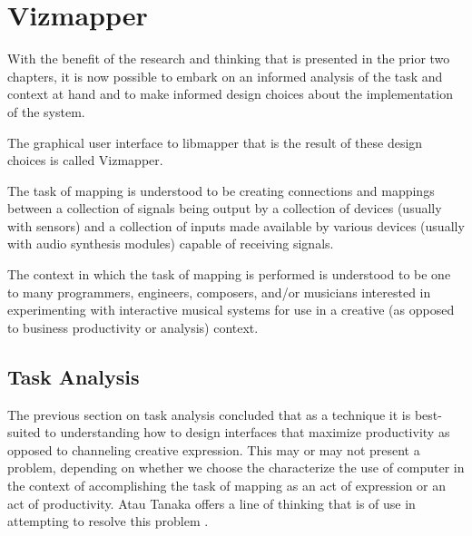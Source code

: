 \resetdatestamp

\chapter{Vizmapper}

With the benefit of the research and thinking that is presented in the prior two chapters, it is now possible to embark on an informed analysis of the task and context at hand and to make informed design choices about the implementation of the system.

The graphical user interface to libmapper that is the result of these design choices is called Vizmapper.

The task of mapping is understood to be creating connections and mappings between a collection of signals being output by a collection of devices (usually with sensors) and a collection of inputs made available by various devices (usually with audio synthesis modules)  capable of receiving signals.

The context in which the task of mapping is performed is understood to be one to many programmers, engineers, composers, and/or musicians interested in experimenting with interactive musical systems for use in a creative (as opposed to business productivity or analysis) context.

\section{Task Analysis}
\begin{comment}
Task analysis and human-computer interaction: approaches, techniques, and levels of analysis - Abe Crystal, Beth Ellington
\end{comment}

The previous section on task analysis concluded that as a technique it is best-suited to understanding how to design interfaces that maximize productivity as opposed to channeling creative expression. This may or may not present a problem, depending on whether we choose the characterize the use of computer in the context of accomplishing the task of mapping as an act of expression or an act of productivity. Atau Tanaka offers a line of thinking that is of use in attempting to resolve this problem \cite{tanaka2000}.

